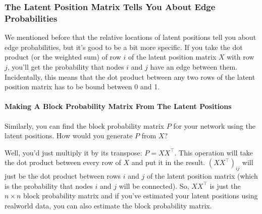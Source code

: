 \documentclass[letterpaper,10pt,english]{jupyterBook}
\begin{document}
\subsubsection{The Latent Position Matrix Tells You About Edge Probabilities}
\label{\detokenize{representations/ch6/why-embed-networks:the-latent-position-matrix-tells-you-about-edge-probabilities}}
\sphinxAtStartPar
We mentioned before that the relative locations of latent positions tell you about edge probabilities, but it’s good to be a bit more specific. If you take the dot product (or the weighted sum) of row \(i\) of the latent position matrix \(X\) with row \(j\), you’ll get the probability that nodes \(i\) and \(j\) have an edge between them. Incidentally, this means that the dot product between any two rows of the latent position matrix has to be bound between 0 and 1.


\paragraph{Making A Block Probability Matrix From The Latent Positions}
\label{\detokenize{representations/ch6/why-embed-networks:making-a-block-probability-matrix-from-the-latent-positions}}
\sphinxAtStartPar
Similarly, you can find the block probability matrix \(P\) for your network using the latent positions. How would you generate \(P\) from \(X\)?

\sphinxAtStartPar
Well, you’d just multiply it by its transpose: \(P = XX^\top\). This operation will take the dot product between every row of \(X\) and put it in the result. \((XX^\top)_{ij}\) will just be the dot product between rows \(i\) and \(j\) of the latent position matrix (which is the probability that nodes \(i\) and \(j\) will be connected). So, \(XX^\top\) is just the \(n \times n\) block probability matrix \sphinxhyphen{} and if you’ve estimated your latent positions using real\sphinxhyphen{}world data, you can also estimate the block probability matrix.
\end{document}

